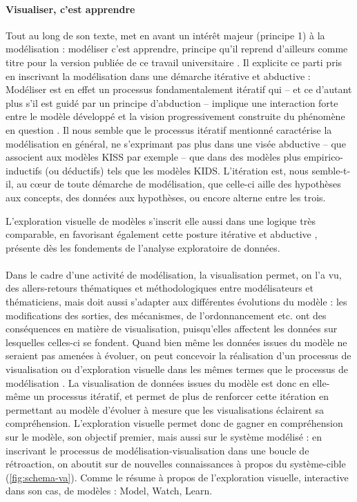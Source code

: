 \paragraph{Visualiser, c'est apprendre}
Tout au long de son texte, \textcite{banos_pour_2013} met en avant un intérêt majeur (principe 1) à la modélisation : \og modéliser c'est apprendre\fg{}, principe qu'il reprend d'ailleurs comme titre pour la version publiée de ce travail universitaire \autocite{banos_modeliser_2016}.
Il explicite ce parti pris en inscrivant la modélisation dans une démarche itérative et abductive : \og
Modéliser est en effet un processus fondamentalement itératif qui -- et ce d'autant plus s'il est guidé par un principe d'abduction -- implique une interaction forte entre le modèle développé et la vision progressivement construite du phénomène en question
\fg{} \autocite[77]{banos_pour_2013}.
Il nous semble que le processus itératif mentionné caractérise la modélisation en général, ne s'exprimant pas plus dans une visée abductive -- que \textcite{livet2014diversite} associent aux modèles KISS par exemple -- que dans des modèles plus empirico-inductifs (ou déductifs) tels que les modèles KIDS.
L'itération est, nous semble-t-il, au cœur de toute démarche de modélisation, que celle-ci aille des hypothèses aux concepts, des données aux hypothèses, ou encore alterne entre les trois. 

\noindent L'exploration visuelle de modèles s'inscrit elle aussi dans une logique très comparable, en favorisant également cette posture itérative et abductive \autocite[\ppno~239--240]{banos2005voie}, présente dès les fondements de l'analyse exploratoire de données.

\paragraph[Ccl : Modélisation et visualisation]{}
Dans le cadre d'une activité de modélisation, la visualisation permet, on l'a vu, des allers-retours thématiques et méthodologiques entre modélisateurs et thématiciens, mais doit aussi s'adapter aux différentes évolutions du modèle :
	les modifications des sorties, des mécanismes, de l'ordonnancement etc. ont des conséquences en matière de visualisation, puisqu'elles affectent les données sur lesquelles celles-ci se fondent.
Quand bien même les données issues du modèle ne seraient pas amenées à évoluer, on peut concevoir la réalisation d'un processus de visualisation ou d'exploration visuelle dans les mêmes termes que le processus de modélisation \autocite{andrienko2018viewing}.
La visualisation de données issues du modèle est donc en elle-même un processus itératif, et permet de plus de renforcer cette itération en permettant au modèle d'évoluer à mesure que les visualisations éclairent sa compréhension.
L'exploration visuelle permet donc de gagner en compréhension sur le modèle, son objectif premier, mais aussi sur le système modélisé :
	en inscrivant le processus de modélisation-visualisation dans une boucle de rétroaction, on aboutit sur de nouvelles connaissances à propos du système-cible (\cref{fig:schema-va}).
Comme le résume \textcite{victor_simulation_2009} à propos de l'exploration visuelle, interactive dans son cas, de modèles : \og Model, Watch, Learn\fg{}.

